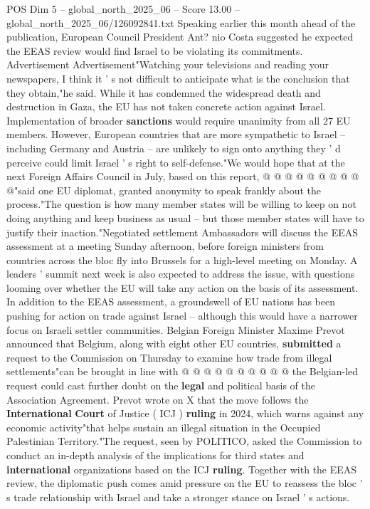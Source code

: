 \begin{textsample}{POS Dim 5 – global\_north\_2025\_06 – Score 13.00 – global\_north\_2025\_06/126092841.txt}
Speaking earlier this month ahead of the publication, European Council President Ant? nio Costa suggested he expected the EEAS review would find Israel to be violating its commitments.
Advertisement Advertisement"Watching your televisions and reading your newspapers, I think it ' s not difficult to anticipate what is the conclusion that they obtain,"he said.
While it has condemned the widespread death and destruction in Gaza, the EU has not taken concrete action against Israel.
Implementation of broader \textbf{sanctions} would require unanimity from all 27 EU members.
However, European countries that are more sympathetic to Israel -- including Germany and Austria -- are unlikely to sign onto anything they ' d perceive could limit Israel ' s right to self-defense."We would hope that at the next Foreign Affairs Council in July, based on this report, @ @ @ @ @ @ @ @ @ @"said one EU diplomat, granted anonymity to speak frankly about the process."The question is how many member states will be willing to keep on not doing anything and keep business as usual -- but those member states will have to justify their inaction."Negotiated settlement Ambassadors will discuss the EEAS assessment at a meeting Sunday afternoon, before foreign ministers from countries across the bloc fly into Brussels for a high-level meeting on Monday.
A leaders ' summit next week is also expected to address the issue, with questions looming over whether the EU will take any action on the basis of its assessment.
In addition to the EEAS assessment, a groundswell of EU nations has been pushing for action on trade against Israel -- although this would have a narrower focus on Israeli settler communities.
Belgian Foreign Minister Maxime Prevot announced that Belgium, along with eight other EU countries, \textbf{submitted} a request to the Commission on Thursday to examine how trade from illegal settlements"can be brought in line with @ @ @ @ @ @ @ @ @ @ the Belgian-led request could cast further doubt on the \textbf{legal} and political basis of the Association Agreement.
Prevot wrote on X that the move follows the \textbf{International} \textbf{Court} of Justice ( ICJ ) \textbf{ruling} in 2024, which warns against any economic activity"that helps sustain an illegal situation in the Occupied Palestinian Territory."The request, seen by POLITICO, asked the Commission to conduct an in-depth analysis of the implications for third states and \textbf{international} organizations based on the ICJ \textbf{ruling}.
Together with the EEAS review, the diplomatic push comes amid pressure on the EU to reassess the bloc ' s trade relationship with Israel and take a stronger stance on Israel ' s actions.

\end{textsample}
